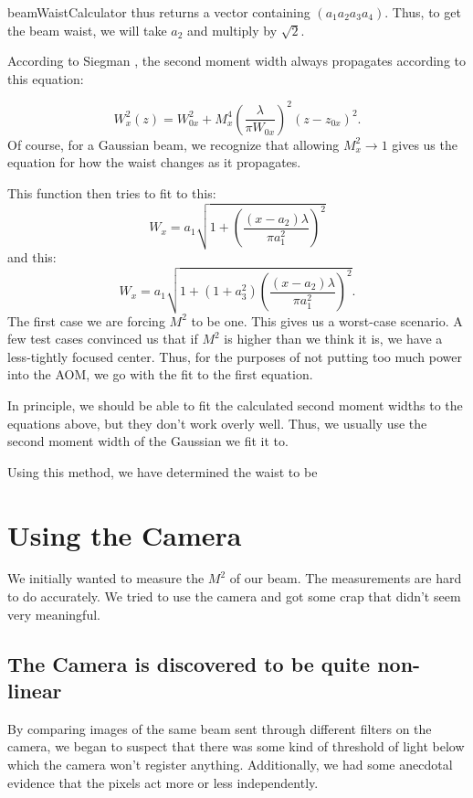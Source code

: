 beamWaistCalculator thus returns a vector containing $(a_1 a_2 a_3 a_4)$. Thus, to get the beam waist, we will take $a_2$ and multiply by $\sqrt{2}$. 

According to Siegman \cite{SiegmanBeamQuality}, the second moment width always propagates according to this equation: 

\begin{equation}
W_x^2(z)=W_{0x}^2 + M_x^4 \left( \frac{\lambda}{\pi W_{0x}}\right)^2 (z-z_{0x})^2. 
\end{equation}
Of course, for a Gaussian beam, we recognize that allowing $M_x^2\rightarrow 1$ gives us the equation for how the waist changes as it propagates. 

This function then tries to fit to this:
\begin{equation}
W_x=a_1 \sqrt{1+\left(\frac{(x-a_2) \lambda}{\pi a_1^2}\right)^2}
\end{equation}
and this:
\begin{equation}
W_x=a_1 \sqrt{1+(1+a_3^2) \left(\frac{(x-a_2) \lambda}{\pi a_1^2}\right)^2}. 
\end{equation}
The first case we are forcing $M^2$ to be one. This gives us a worst-case scenario. A few test cases convinced us that if $M^2$ is higher than we think it is, we have a less-tightly focused center. Thus, for the purposes of not putting too much power into the AOM, we go with the fit to the first equation. 

In principle, we should be able to fit the calculated second moment widths to the equations above, but they don't work overly well. Thus, we usually use the second moment width of the Gaussian we fit it to. 

Using this method, we have determined the waist to be 


\section{Using the Camera}
We initially wanted to measure the $M^2$ of our beam. The measurements are hard to do accurately. We tried to use the camera and got some crap that didn't seem very meaningful.

\subsection{The Camera is discovered to be quite non-linear}

By comparing images of the same beam sent through different filters on the camera, we began to suspect that there was some kind of threshold of light below which the camera won't register anything. Additionally, we had some anecdotal evidence that the pixels act more or less independently.

